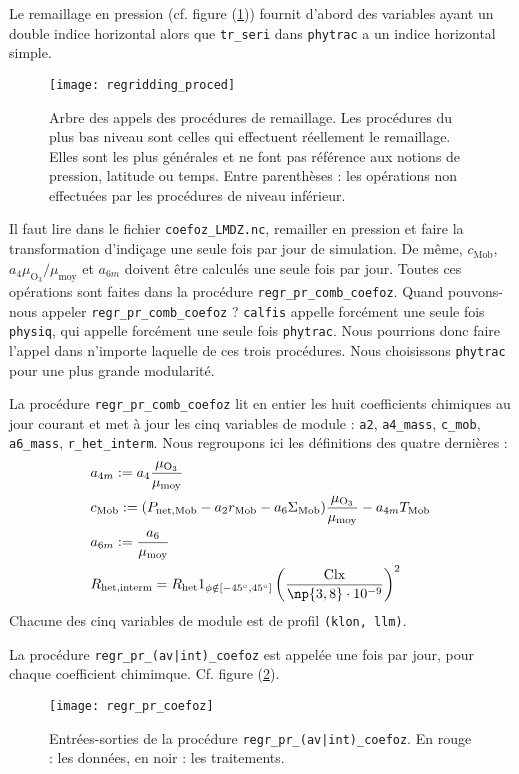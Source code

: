 \documentclass[a4paper,english,french]{article}
\begin{document}
Le remaillage en pression (cf. figure (\ref{fig:regridding_proced}))
fournit d'abord des variables ayant un double indice horizontal alors
que \verb+tr_seri+ dans \verb+phytrac+ a un indice horizontal simple.
\begin{figure}[htbp]
  \centering
  \texttt{[image: regridding\_proced]}
  \caption[Arbre des appels des procédures de remaillage]{Arbre des
    appels des procédures de remaillage. Les procédures du plus bas
    niveau sont celles qui effectuent réellement le remaillage. Elles
    sont les plus générales et ne font pas référence aux notions de
    pression, latitude ou temps. Entre parenthèses : les opérations
    non effectuées par les procédures de niveau inférieur.}
  \label{fig:regridding_proced}
\end{figure}
Il faut lire dans le fichier \verb+coefoz_LMDZ.nc+, remailler en
pression et faire la transformation d'indiçage une seule fois par jour
de simulation. De même, $c_\mathrm{Mob}$, $a_4 \mu_{\mathrm{O}_3} /
\mu_\mathrm{moy}$ et $a_{6m}$ doivent être calculés une seule fois par
jour. Toutes ces opérations sont faites dans la procédure
\verb+regr_pr_comb_coefoz+.  Quand pouvons-nous appeler
\verb+regr_pr_comb_coefoz+ ? \verb+calfis+ appelle forcément une seule
fois \verb+physiq+, qui appelle forcément une seule fois
\verb+phytrac+. Nous pourrions donc faire l'appel dans n'importe
laquelle de ces trois procédures. Nous choisissons \verb+phytrac+ pour
une plus grande modularité.

La procédure \verb+regr_pr_comb_coefoz+ lit en entier les huit
coefficients chimiques au jour courant et met à jour les cinq
variables de module : \verb+a2+, \verb+a4_mass+, \verb+c_mob+,
\verb+a6_mass+, \verb+r_het_interm+.  Nous regroupons ici les
définitions des quatre dernières :
\begin{align*}
  & a_{4m} := a_4 \frac{\mu_{\mathrm{O}_3}}{\mu_\mathrm{moy}} \\
  & c_\mathrm{Mob}
  := (P_\mathrm{net,Mob} - a_2 r_\mathrm{Mob} - a_6 \Sigma_\mathrm{Mob})
  \frac{\mu_{\mathrm{O}_3}}{\mu_\mathrm{moy}} - a_{4m} T_\mathrm{Mob} \\
  & a_{6m} := \frac{a_6}{\mu_\mathrm{moy}} \\
  & R_\mathrm{het,interm} = R_\mathrm{het} 1_{\phi \notin [- 45^\circ, 45^\circ]} 
  \left(\frac{\mathrm{Clx}}{\np{3,8} \cdot 10^{-9}}\right)^2
\end{align*}
Chacune des cinq variables de module est de profil \verb+(klon, llm)+.

La procédure \verb+regr_pr_(av|int)_coefoz+ est appelée une fois par
jour, pour chaque coefficient chimimque. Cf. figure (\ref{fig:regr_pr_coefoz}).
\begin{figure}[htbp]
  \centering
  \texttt{[image: regr\_pr\_coefoz]}
  \caption[Entrées-sorties de la procédure
  \texttt{regr\_pr\_(av|int)\_coefoz}]{Entrées-sorties de la procédure
    \texttt{regr\_pr\_(av|int)\_coefoz}. En rouge : les données, en
    noir : les traitements.}
  \label{fig:regr_pr_coefoz}
\end{figure}
\end{document}
